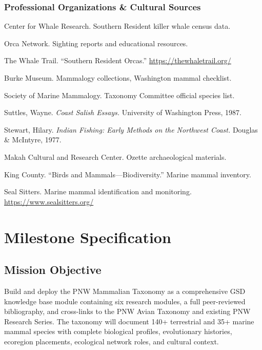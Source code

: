 \documentclass[11pt,letterpaper]{article}
\newcommand{\stageheader}[2]{%
  \noindent\colorbox{#2}{\makebox[\textwidth][l]{%
    \textcolor{white}{\bfseries\sffamily\hspace{6pt}#1\hspace{6pt}}}}%
  \vspace{0.5em}\par%
}
\begin{document}
\subsubsection{Professional Organizations \& Cultural Sources}
\begin{enumerate}[leftmargin=2em, label={[O\arabic*]}]
\item Center for Whale Research. Southern Resident killer whale census data.
\item Orca Network. Sighting reports and educational resources.
\item The Whale Trail. ``Southern Resident Orcas.'' \url{https://thewhaletrail.org/}
\item Burke Museum. Mammalogy collections, Washington mammal checklist.
\item Society of Marine Mammalogy. Taxonomy Committee official species list.
\item Suttles, Wayne. \textit{Coast Salish Essays.} University of Washington Press, 1987.
\item Stewart, Hilary. \textit{Indian Fishing: Early Methods on the Northwest Coast.} Douglas \& McIntyre, 1977.
\item Makah Cultural and Research Center. Ozette archaeological materials.
\item King County. ``Birds and Mammals---Biodiversity.'' Marine mammal inventory.
\item Seal Sitters. Marine mammal identification and monitoring. \url{https://www.sealsitters.org/}
\end{enumerate}

\newpage

\stageheader{STAGE 3 --- MISSION PACKAGE}{tertiary}

\section{Milestone Specification}

\subsection{Mission Objective}

Build and deploy the PNW Mammalian Taxonomy as a comprehensive GSD knowledge base module containing six research modules, a full peer-reviewed bibliography, and cross-links to the PNW Avian Taxonomy and existing PNW Research Series. The taxonomy will document 140+ terrestrial and 35+ marine mammal species with complete biological profiles, evolutionary histories, ecoregion placements, ecological network roles, and cultural context.
\end{document}
